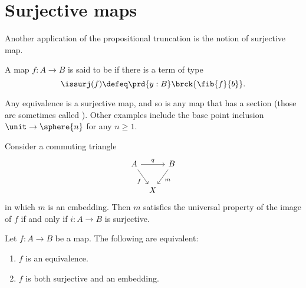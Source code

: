 \section{Surjective maps}

Another application of the propositional truncation is the notion of surjective map.

\begin{defn}
A map $f:A\to B$ is said to be  if there is a term of type
\begin{equation*}
\issurj(f)\defeq \prd{y:B}\brck{\fib{f}{b}}.
\end{equation*}
\end{defn}

\begin{eg}
Any equivalence is a surjective map, and so is any map that has a section (those are sometimes called ). Other examples include the base point inclusion $\unit\to\sphere{n}$ for any $n\geq 1$. 
\end{eg}

\begin{thm}\label{thm:surjective}
Consider a commuting triangle
\begin{equation*}
\begin{tikzcd}[column sep=tiny]
A \arrow[rr,"q"] \arrow[dr,swap,"f"] & & B \arrow[dl,"m"] \\
& X
\end{tikzcd}
\end{equation*}
in which $m$ is an embedding. Then $m$ satisfies the universal property of the image of $f$ if and only if $i:A\to B$ is surjective.
\end{thm}

\begin{thm}
Let $f:A\to B$ be a map. The following are equivalent:
\begin{enumerate}
\item $f$ is an equivalence.
\item $f$ is both surjective and an embedding.
\end{enumerate}
\end{thm}


